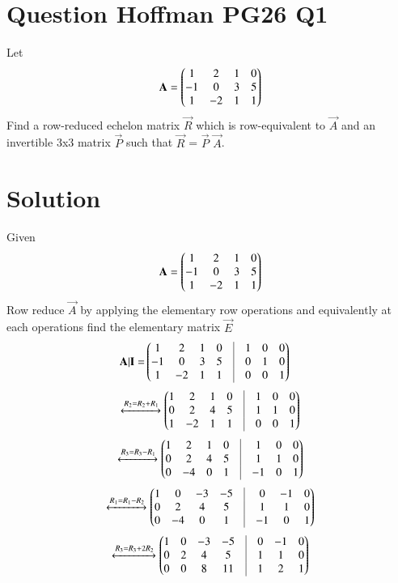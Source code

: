 \documentclass[journal,12pt,twocolumn]{IEEEtran}
\begin{document}
%
\section{Question Hoffman PG26 Q1 }
Let
\begin{align}
\mathbf{A}=\begin{pmatrix}1&2&1&0\\-1&0&3&5\\1&-2&1&1\end{pmatrix}  
\end{align}
Find a row-reduced echelon matrix $\vec{R}$ which is row-equivalent to $\vec{A}$ and an invertible 3x3 matrix $\vec{P}$ such that $\vec{R}$ = $\vec{P}$ $\vec{A}$.
\section{\textbf{Solution}}Given 
\begin{align}
\mathbf{A}=\begin{pmatrix}1&2&1&0\\-1&0&3&5\\1&-2&1&1\end{pmatrix}
\end{align}
Row reduce $\vec{A}$ by applying the elementary row operations and equivalently at each operations find the elementary matrix $\vec{E}$
\begin{align}
    \vec{A|I}=&\myvec{1&2&1&0&\vrule&1&0&0\\-1&0&3&5&\vrule&0&1&0\\1&-2&1&1&\vrule&0&0&1}
\end{align}
\begin{align}
    \xleftrightarrow{R_2=R_2+R_1}\myvec{1&2&1&0&\vrule&1&0&0\\0&2&4&5&\vrule&1&1&0\\1&-2&1&1&\vrule&0&0&1}
\end{align}
\begin{align}
\xleftrightarrow{R_3=R_3-R_1}\myvec{1&2&1&0&\vrule&1&0&0\\0&2&4&5&\vrule&1&1&0\\0&-4&0&1&\vrule&-1&0&1}
\end{align}
\begin{align}
\xleftrightarrow{R_1=R_1-R_2}\myvec{1&0&-3&-5&\vrule&0&-1&0\\0&2&4&5&\vrule&1&1&0\\0&-4&0&1&\vrule&-1&0&1}
\end{align}
\begin{align}
\xleftrightarrow{R_3=R_3+2R_2}\myvec{1&0&-3&-5&\vrule&0&-1&0\\0&2&4&5&\vrule&1&1&0\\0&0&8&11&\vrule&1&2&1}
\end{align}
\end{document}
